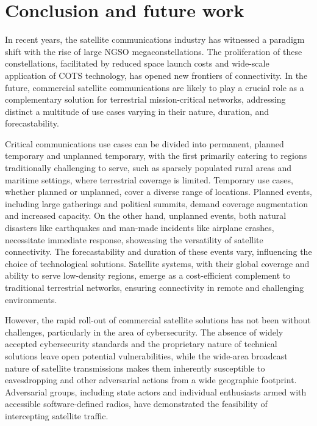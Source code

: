 \documentclass[english, 12pt, a4paper, elec, utf8, a-1b, online]{aaltothesis}
\begin{document}
\clearpage

\section{Conclusion and future work}

In recent years, the satellite communications industry has witnessed a paradigm shift with the rise of large NGSO megaconstellations.
The proliferation of these constellations, facilitated by reduced space launch costs and wide-scale application of COTS technology, has opened new frontiers of connectivity.
In the future, commercial satellite communications are likely to play a crucial role as a complementary solution for terrestrial mission-critical networks, addressing distinct a multitude of use cases varying in their nature, duration, and forecastability.

Critical communications use cases can be divided into permanent, planned temporary and unplanned temporary, with the first primarily catering to regions traditionally challenging to serve, such as sparsely populated rural areas and maritime settings, where terrestrial coverage is limited. Temporary use cases, whether planned or unplanned, cover a diverse range of locations. Planned events, including large gatherings and political summits, demand coverage augmentation and increased capacity. On the other hand, unplanned events, both natural disasters like earthquakes and man-made incidents like airplane crashes, necessitate immediate response, showcasing the versatility of satellite connectivity. The forecastability and duration of these events vary, influencing the choice of technological solutions. Satellite systems, with their global coverage and ability to serve low-density regions, emerge as a cost-efficient complement to traditional terrestrial networks, ensuring connectivity in remote and challenging environments.

However, the rapid roll-out of commercial satellite solutions has not been without challenges, particularly in the area of cybersecurity.
The absence of widely accepted cybersecurity standards and the proprietary nature of technical solutions leave open potential vulnerabilities, while the wide-area broadcast nature of satellite transmissions makes them inherently susceptible to eavesdropping and other adversarial actions from a wide geographic footprint.
Adversarial groups, including state actors and individual enthusiasts armed with accessible software-defined radios, have demonstrated the feasibility of intercepting satellite traffic.
\end{document}
